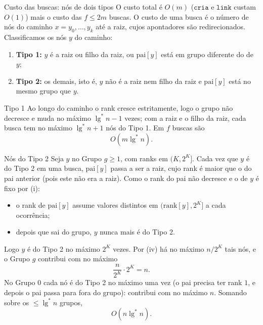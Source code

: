 \documentclass[aspectratio=169,10pt]{beamer}
\newcommand{\Cria}{\mathtt{cria}}
\newcommand{\Link}{\mathtt{link}}
\renewcommand{\lg}{\operatorname{lg}}
\newcommand{\lgs}{\lg^{*}}
\begin{document}
\begin{frame}[t]{Custo das buscas: nós de dois tipos}
  \small
  O custo total é $O(m)$ ($\Cria$ e $\Link$ custam $O(1)$) mais o custo
  das $f\leq2m$ buscas.  O custo de uma busca é o número de nós do
  caminho $x=y_0,\dots,y_k$ até a raiz, cujos apontadores são
  redirecionados.  Classificamos os nós $y$ do caminho:
  \begin{enumerate}
  \item \textbf{Tipo 1:} $y$ é a raiz ou filho da raiz, ou
    $\mathrm{pai}[y]$ está em grupo diferente do de $y$;
  \item \textbf{Tipo 2:} os demais, isto é, $y$ não é a raiz nem filho
    da raiz e $\mathrm{pai}[y]$ está no mesmo grupo que $y$.
  \end{enumerate}

  \medskip
  \begin{block}{Tipo 1}
    Ao longo do caminho o rank cresce estritamente, logo o grupo não
    decresce e muda no máximo $\lgs n-1$ vezes; com a raiz e o filho da
    raiz, cada busca tem no máximo $\lgs n+1$ nós do Tipo 1.  Em $f$
    buscas são
    \[
      O(m\lgs n).
    \]
  \end{block}
\end{frame}

\begin{frame}[t]{Nós do Tipo 2}
  \small
  Seja $y$ no Grupo $g\geq1$, com ranks em $(K,2^K]$.  Cada vez que $y$
  é do Tipo 2 em uma busca, $\mathrm{pai}[y]$ passa a ser a raiz, cujo
  rank é maior que o do pai anterior (pois este não era a raiz).  Como o
  rank do pai não decresce e o de $y$ é fixo por (i):
  \begin{itemize}
  \item o rank de $\mathrm{pai}[y]$ assume valores distintos em
    $(\mathrm{rank}[y],2^K]$ a cada ocorrência;
  \item depois que sai do grupo, $y$ nunca mais é do Tipo 2.
  \end{itemize}
  Logo $y$ é do Tipo 2 no máximo $2^K$ vezes.  Por (iv) há no máximo
  $n/2^K$ tais nós, e o Grupo $g$ contribui com no máximo
  \[
    \frac{n}{2^K}\cdot2^K=n.
  \]
  No Grupo $0$ cada nó é do Tipo 2 no máximo uma vez (o pai precisa ter
  rank $1$, e depois o pai passa para fora do grupo): contribui com no
  máximo $n$.  Somando sobre os $\leq\lgs n$ grupos,
  \[
    O(n\lgs n).
  \]
\end{frame}
\end{document}
